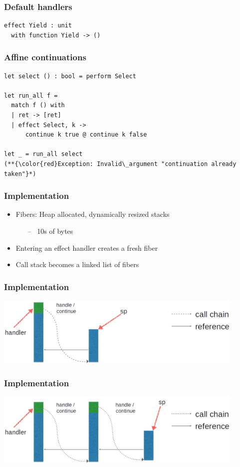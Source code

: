 \documentclass{beamer}
\begin{document}
\begin{frame}[fragile]
\frametitle{Default handlers}
\begin{lstlisting}[style=ocaml]
effect Yield : unit
  with function Yield -> ()
\end{lstlisting}
\end{frame}

\begin{frame}[fragile]
\frametitle{Affine continuations}
\begin{lstlisting}[style=ocaml]
let select () : bool = perform Select

let run_all f =
  match f () with
  | ret -> [ret]
  | effect Select, k ->
      continue k true @ continue k false

let _ = run_all select
(**{\color{red}Exception: Invalid\_argument "continuation already taken"}*)
\end{lstlisting}
\end{frame}

\begin{frame}
\frametitle{Implementation}
\begin{itemize}
\setlength\itemsep{2em}
\item Fibers: Heap allocated, dynamically resized stacks
\begin{itemize}
\item[--] ~10s of bytes
\end{itemize}
\item Entering an effect handler creates a fresh fiber
\item Call stack becomes a linked list of fibers
\end{itemize}
\end{frame}

\begin{frame}[fragile]
\frametitle{Implementation}
\begin{center}
\includegraphics[width = 0.9\textwidth]{./imp1}
\end{center}
\end{frame}

\begin{frame}[fragile]
\frametitle{Implementation}
\begin{center}
\includegraphics[width = 0.9\textwidth]{./imp2}
\end{center}
\end{frame}
\end{document}
